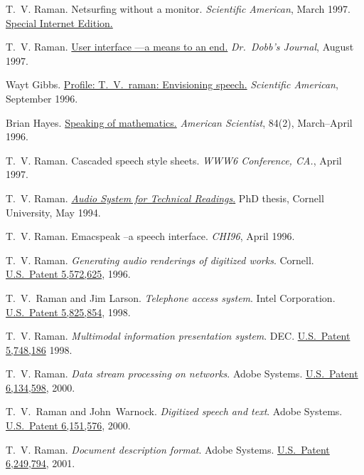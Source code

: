 \documentclass{article}
\begin{document}
\begin{compactitem}{}
\item   T.~V. Raman.  
 Netsurfing without a monitor.  
 {\em Scientific American}, March 1997.
 \href{http://www.sciam.com/0397issue/0397raman.html}%
{Special Internet Edition.}
\item   T.~V.  Raman.  
\href{http://www.drdobbs.com/user-interface-a-means-to-an-end/184410453}%
{User interface ---a means to an end.}  
 {\em Dr.\ 
  Dobb's Journal}, August 1997.
\item   Wayt Gibbs.  
\href{http://www.sciam.com/0996issue/0996profile.html}%
{Profile: T.\ V.\ raman: Envisioning speech.}  
 {\em
  Scientific American}, September 1996.
\item   Brian Hayes.
  \href{http://www.amsci.org/amsci/issues/Comsci96/compsci96-03.html}%
{Speaking of mathematics.}  
 {\em American Scientist},
84(2), March--April 1996.
\item   T.~V. Raman.  
 Cascaded speech
  style sheets.  
 {\em WWW6 Conference, CA.}, April
  1997.
\item   T.~V.  Raman.  
\href{http://www.cs.cornell.edu/home/raman/aster/aster-toplevel.html}%
{{\em Audio System for Technical Readings}.}  
 PhD
thesis, Cornell University, May 1994.
\item   T.~V.  Raman.  
 Emacspeak --a
  speech interface.  
 {\em CHI96}, April 1996.
\item  T.~V. Raman.  
  \emph{Generating audio renderings of digitized works}.
 Cornell.
 \href{https://www.google.com/patents/US5572625}%
{U.S.\ Patent 5,572,625},  1996.
\item  T.\ V.\ Raman and Jim Larson.
 \emph{Telephone access system}.  
 Intel Corporation.
 \href{https://www.google.com/patents/US5825854}%
{U.S.\ Patent 5,825,854},  1998.
\item  T.~V. Raman.  
  \emph{Multimodal information presentation system}.  
 DEC.\@
 \href{https://www.google.com/patents/US5748186}%
{U.S.\ Patent 5,748,186}  1998.
\item  T.~V. Raman.  
 \emph{Data stream processing on networks}.  
 Adobe Systems.
 \href{https://www.google.com/patents/US6134598}%
{U.S.\ Patent 6,134,598},  2000.
\item   T.~V.\ Raman and John~Warnock.
 \emph{Digitized speech and text}.  
 Adobe Systems.
 \href{https://www.google.com/patents/US6151576}%
{U.S.\ Patent 6,151,576},  2000.
\item   T.~V. Raman.  
 \emph{Document description format}.  
 Adobe Systems.
 \href{https://www.google.com/patents/US6249794}%
{U.S.\ Patent 6,249,794},  2001.

\end{compactitem}
\end{document}
